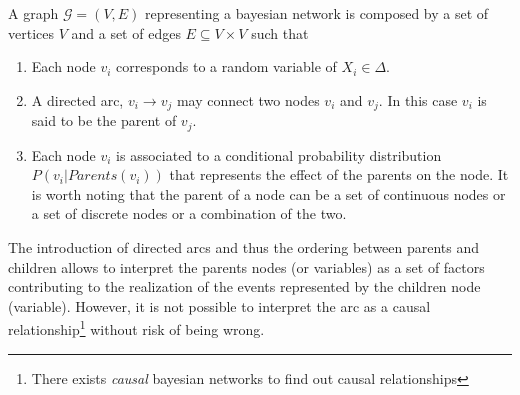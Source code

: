 \documentclass{article}
\begin{document}
A graph $\mathcal{G} = (V,E)$ representing a bayesian network is composed by a set of vertices $V$ and a set of edges $E \subseteq V \times V$ such that 
\begin{enumerate}
    \item Each node $v_i$ corresponds to a random variable of $X_i \in  \Delta$.
    \item A directed arc,  $v_i \rightarrow v_j$ may connect two nodes $v_i$ and $v_j$. In this case $v_i$ is said to be the parent of $v_j$.
    \item Each node $v_i$ is associated to a conditional probability distribution $P(v_i  |Parents(v_i))$ that represents the effect of the parents on the node. It is worth noting that the parent of a node can be  a set of continuous nodes or a set of discrete nodes or a combination of the two.
\end{enumerate}
The introduction of directed arcs and thus the ordering between parents and children allows to interpret the parents nodes (or variables) as a set of factors contributing to the realization of the events represented by the children node (variable). However, it is not possible to interpret the arc as a causal relationship\footnote{There exists \textit{causal} bayesian networks to find out causal relationships} without risk of being wrong.\\
\end{document}
